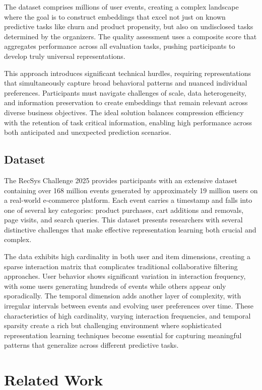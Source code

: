 \documentclass[sigconf]{acmart}
\begin{document}
The dataset comprises millions of user events, creating a complex landscape where the goal is to construct embeddings that excel not just on known predictive tasks like churn and product propensity, but also on undisclosed tasks determined by the organizers. The quality assessment uses a composite score that aggregates performance across all evaluation tasks, pushing participants to develop truly universal representations.

This approach introduces significant technical hurdles, requiring representations that simultaneously capture broad behavioral patterns and nuanced individual preferences. Participants must navigate challenges of scale, data heterogeneity, and information preservation to create embeddings that remain relevant across diverse business objectives. The ideal solution balances compression efficiency with the retention of task critical information, enabling high performance across both anticipated and unexpected prediction scenarios.
\subsection{Dataset}
The RecSys Challenge 2025 provides participants with an extensive dataset containing over 168 million events generated by approximately 19 million users on a real-world e-commerce platform. Each event carries a timestamp and falls into one of several key categories: product purchases, cart additions and removals, page visits, and search queries. This dataset presents researchers with several distinctive challenges that make effective representation learning both crucial and complex.

The data exhibits high cardinality in both user and item dimensions, creating a sparse interaction matrix that complicates traditional collaborative filtering approaches. User behavior shows significant variation in interaction frequency, with some users generating hundreds of events while others appear only sporadically. The temporal dimension adds another layer of complexity, with irregular intervals between events and evolving user preferences over time. These characteristics of high cardinality, varying interaction frequencies, and temporal sparsity create a rich but challenging environment where sophisticated representation learning techniques become essential for capturing meaningful patterns that generalize across different predictive tasks.

\label{sec:related}
\section{Related Work}
\end{document}
